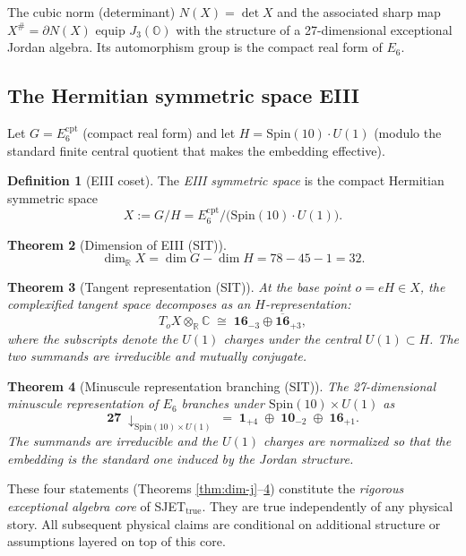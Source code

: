 \documentclass[11pt]{article}
\theoremstyle{plain}
\newtheorem{theorem}{Theorem}[section]
\theoremstyle{definition}
\newtheorem{definition}[theorem]{Definition}
\theoremstyle{remark}
\numberwithin{equation}{section}
\newcommand{\R}{\mathbb{R}}
\newcommand{\C}{\mathbb{C}}
\newcommand{\Oct}{\mathbb{O}}
\newcommand{\Spin}{\mathrm{Spin}}
\begin{document}
The cubic norm (determinant) $N(X) = \det X$ and the associated sharp map $X^\# = \partial N(X)$ equip $J_3(\Oct)$ with the structure of a 27-dimensional exceptional Jordan algebra. Its automorphism group is the compact real form of $E_6$.

\subsection{The Hermitian symmetric space EIII}

Let $G = E_6^{\mathrm{cpt}}$ (compact real form) and let $H = \Spin(10)\cdot U(1)$ (modulo the standard finite central quotient that makes the embedding effective).

\begin{definition}[EIII coset]\label{def:eiii}
The \emph{EIII symmetric space} is the compact Hermitian symmetric space
\[
X := G/H = E_6^{\mathrm{cpt}} \big/ \bigl(\Spin(10)\cdot U(1)\bigr).
\]
\end{definition}

\begin{theorem}[Dimension of EIII (SIT)]\label{thm:dim-eiii}
\[
\dim_{\R} X = \dim G - \dim H = 78 - 45 - 1 = 32.
\]
\end{theorem}

\begin{theorem}[Tangent representation (SIT)]\label{thm:tangent}
At the base point $o = eH \in X$, the complexified tangent space decomposes as an $H$-representation:
\[
T_oX \otimes_{\R}\C \;\cong\; \mathbf{16}_{-3} \oplus \overline{\mathbf{16}}_{+3},
\]
where the subscripts denote the $U(1)$ charges under the central $U(1)\subset H$. The two summands are irreducible and mutually conjugate.
\end{theorem}

\begin{theorem}[Minuscule representation branching (SIT)]\label{thm:27-branch}
The 27-dimensional minuscule representation of $E_6$ branches under $\Spin(10)\times U(1)$ as
\[
\mathbf{27}\;\downarrow_{\Spin(10)\times U(1)}\;=\; \mathbf{1}_{+4} \;\oplus\; \mathbf{10}_{-2} \;\oplus\; \mathbf{16}_{+1}.
\]
The summands are irreducible and the $U(1)$ charges are normalized so that the embedding is the standard one induced by the Jordan structure.
\end{theorem}

These four statements (Theorems \ref{thm:dim-j}--\ref{thm:27-branch}) constitute the \emph{rigorous exceptional algebra core} of SJET$_{\mathrm{true}}$. They are true independently of any physical story. All subsequent physical claims are conditional on additional structure or assumptions layered on top of this core.
\end{document}
